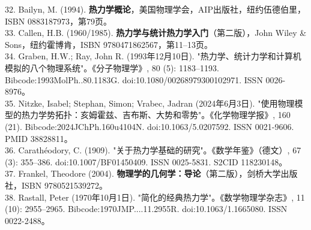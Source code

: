 32. Bailyn, M. (1994). \textbf{热力学概论}，美国物理学会，AIP出版社，纽约伍德伯里，ISBN 0883187973，第79页。\\
33. Callen, H.B. (1960/1985). \textbf{热力学与统计热力学入门}（第二版），John Wiley & Sons，纽约霍博肯，ISBN 9780471862567，第11–13页。\\
34. Graben, H.W.; Ray, John R. (1993年12月10日). "热力学、统计力学和计算机模拟的八个物理系统"。《分子物理学》, 80 (5): 1183–1193. Bibcode:1993MolPh..80.1183G. doi:10.1080/00268979300102971. ISSN 0026-8976。\\
35. Nitzke, Isabel; Stephan, Simon; Vrabec, Jadran (2024年6月3日). "使用物理模型的热力学势拓扑：亥姆霍兹、吉布斯、大势和零势"。《化学物理学报》, 160 (21). Bibcode:2024JChPh.160u4104N. doi:10.1063/5.0207592. ISSN 0021-9606. PMID 38828811。\\
36. Carathéodory, C. (1909). "关于热力学基础的研究"。《数学年鉴》（德文）, 67 (3): 355–386. doi:10.1007/BF01450409. ISSN 0025-5831. S2CID 118230148。\\
37. Frankel, Theodore (2004). \textbf{物理学的几何学：导论}（第二版），剑桥大学出版社，ISBN 9780521539272。\\
38. Rastall, Peter (1970年10月1日). "简化的经典热力学"。《数学物理学杂志》, 11 (10): 2955–2965. Bibcode:1970JMP....11.2955R. doi:10.1063/1.1665080. ISSN 0022-2488。
